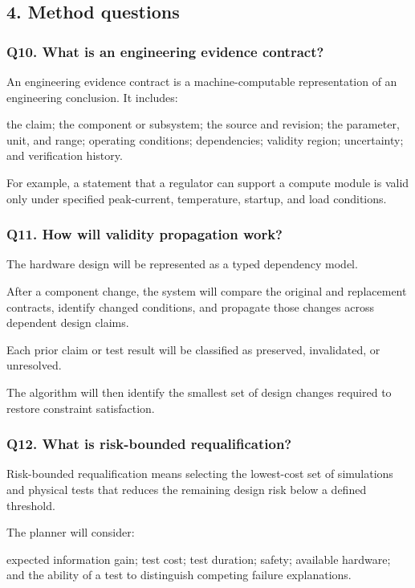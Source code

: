 \documentclass[12pt,letterpaper]{article}
\begin{document}
\subsection{4. Method questions}
\subsubsection{Q10. What is an engineering evidence contract?}

An engineering evidence contract is a machine-computable representation of an engineering conclusion.
It includes:

the claim;
the component or subsystem;
the source and revision;
the parameter, unit, and range;
operating conditions;
dependencies;
validity region;
uncertainty;
and verification history.

For example, a statement that a regulator can support a compute module is valid only under specified peak-current, temperature, startup, and load conditions.

\subsubsection{Q11. How will validity propagation work?}

The hardware design will be represented as a typed dependency model.

After a component change, the system will compare the original and replacement contracts, identify changed conditions, and propagate those changes across dependent design claims.

Each prior claim or test result will be classified as preserved, invalidated, or unresolved.

The algorithm will then identify the smallest set of design changes required to restore constraint satisfaction.

\subsubsection{Q12. What is risk-bounded requalification?}

Risk-bounded requalification means selecting the lowest-cost set of simulations and physical tests that reduces the remaining design risk below a defined threshold.

The planner will consider:

expected information gain;
test cost;
test duration;
safety;
available hardware;
and the ability of a test to distinguish competing failure explanations.
\end{document}
